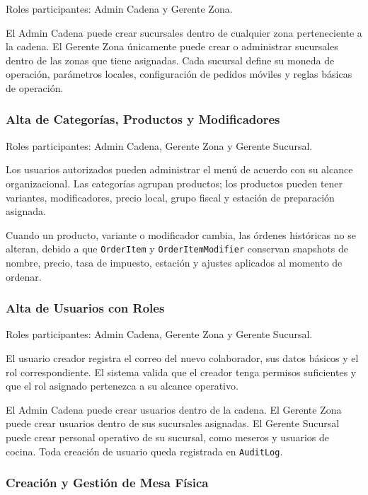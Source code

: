 Roles participantes: Admin Cadena y Gerente Zona.

El Admin Cadena puede crear sucursales dentro de cualquier zona perteneciente a la
cadena. El Gerente Zona únicamente puede crear o administrar sucursales dentro de
las zonas que tiene asignadas. Cada sucursal define su moneda de operación, parámetros
locales, configuración de pedidos móviles y reglas básicas de operación.

\subsubsection{Alta de Categorías, Productos y Modificadores}

Roles participantes: Admin Cadena, Gerente Zona y Gerente Sucursal.

Los usuarios autorizados pueden administrar el menú de acuerdo con su alcance
organizacional. Las categorías agrupan productos; los productos pueden tener variantes,
modificadores, precio local, grupo fiscal y estación de preparación asignada.

Cuando un producto, variante o modificador cambia, las órdenes históricas no se alteran,
debido a que \texttt{OrderItem} y \texttt{OrderItemModifier} conservan snapshots de
nombre, precio, tasa de impuesto, estación y ajustes aplicados al momento de ordenar.

\subsubsection{Alta de Usuarios con Roles}

Roles participantes: Admin Cadena, Gerente Zona y Gerente Sucursal.

El usuario creador registra el correo del nuevo colaborador, sus datos básicos y el rol
correspondiente. El sistema valida que el creador tenga permisos suficientes y que el
rol asignado pertenezca a su alcance operativo.

El Admin Cadena puede crear usuarios dentro de la cadena. El Gerente Zona puede crear
usuarios dentro de sus sucursales asignadas. El Gerente Sucursal puede crear personal
operativo de su sucursal, como meseros y usuarios de cocina. Toda creación de usuario
queda registrada en \texttt{AuditLog}.

\subsubsection{Creación y Gestión de Mesa Física}


